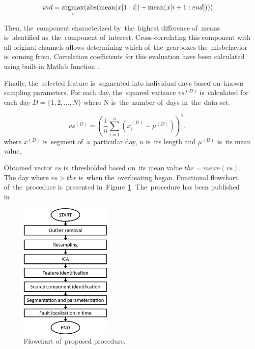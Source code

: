 \begin{equation}\label{eq:divind}
  ind=\operatorname*{argmax}_i(\mathrm{abs}(\mathrm{mean}(x[1:i])-\mathrm{mean}(x[i+1:end])))
\end{equation}

Then, the~component characterized by~the~highest difference of~means is~identified as~the~component of~interest. Cross-correlating this component with all original channels allows determining which of~the~gearboxes the~misbehavior is~coming from. Correlation coefficients for this evaluation have been calculated using built-in Matlab function . 


Finally, the~selected feature is~segmented into individual days based on~known sampling parameters. For each day, the~squared variance $vs^{(D)}$ is~calculated for each day $D=\{1,2,...,N\}$ where N is~the~number of~days in~the~data set. 

\begin{equation}\label{eq:divind2}
  vs^{(D)}=\left(\frac{1}{n}\sum^n_{i=1}\left(x_i^{(D)}-\mu^{(D)} \right)\right)^2,
\end{equation}
where $x^{(D)}$ is~segment of~a~particular day, $n$ is~its length and $\mu^{(D)}$ is~its mean value. 

Obtained vector $vs$ is~thresholded based on~its mean value $thr=mean(vs)$. The day where $vs>thr$ is~when the~overheating began. Functional flowchart of~the~procedure is~presented in~Figure \ref{fig: sch_ica}. The~procedure has been published in~\cite{wodecki2017application}.

\begin{figure}[ht!]
\centering
\includegraphics[width = 0.4\textwidth]{wykresy/sch_ica.png}
\caption{Flowchart of~proposed procedure.}
\label{fig: sch_ica}
\end{figure}

